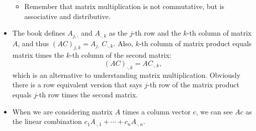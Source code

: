 \documentclass{article}
\begin{document}
\begin{itemize}
\begin{itemize}
        \item Remember that matrix multiplication is not commutative, but is associative and distributive.
    \end{itemize}
    \item The book defines $A_{j,\cdot}$ and $A_{\cdot,k}$ as the $j$-th row and the $k$-th column of matrix $A$, and thus $(AC)_{j,k} = A_{j,\cdot}C_{\cdot,k}$. Also, $k$-th column of matrix product equals matrix times the $k$-th column of the second matrix: $$(AC)_{\cdot,k} = AC_{\cdot,k},$$ which is an alternative to understanding matrix multiplication. Obviously there is a row equivalent version that says $j$-th row of the matrix product equals $j$-th row times the second matrix.
    \item When we are considering matrix $A$ times a column vector $c$, we can see $Ac$ as the linear combination $c_1A_{\cdot,1} + \cdots + c_nA_{\cdot,n}$.
\end{itemize}
\end{document}
